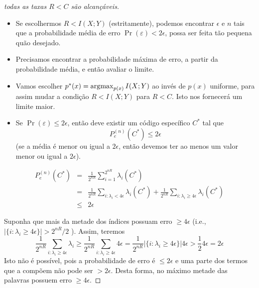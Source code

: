 \begin{frame}[allowframebreaks]
\begin{proof}[todas as taxas $R < C$ são alcançáveis]
  \begin{itemize}
  \item Se escolhermos $R < I(X;Y)$ (estritamente), podemos encontrar $\epsilon$ e $n$ tais que
	a probabilidade média de erro $\Pr(\varepsilon) < 2\epsilon$, possa ser feita tão pequena
	quão desejado.
  \item Precisamos encontrar a probabilidade máxima de erro, a partir da probabilidade média, e então avaliar o limite.
  \item Vamos escolher $p^\ast(x) = \operatorname*{\arg\!\max}_{p(x)} I(X;Y)$ ao invés de $p(x)$ uniforme, para assim mudar
	a condição $R < I(X;Y)$ para $R < C$. Isto nos fornecerá um limite maior.
  \end{itemize}
  \proofbreak
  \begin{itemize}
  \item Se $\Pr(\varepsilon) \leq 2 \epsilon$, então deve existir um código específico $C^\ast$ tal que
	\begin{equation}
	P_e^{(n)} (C^\ast) \leq 2 \epsilon
	\end{equation}
	(se a média é menor ou igual a $2\epsilon$, então devemos ter ao menos um valor menor ou igual a $2\epsilon$).
  \end{itemize}

  \proofbreak

  \begin{eqnarray}
  P_e^{(n)} (C^\ast) &=& \frac{1}{2^{nR}} \sum_{i=1}^{2^{nR}} \lambda_i (C^\ast) \nonumber \\
	&=& \frac{1}{2^{nR}} \sum_{i: \lambda_i < 4\epsilon} \lambda_i (C^\ast) + \frac{1}{2^{nR}} \sum_{i: \lambda_i \geq 4\epsilon} \lambda_i (C^\ast) \nonumber \\
	&\leq& 2 \epsilon
  \end{eqnarray}

  \proofbreak

  Suponha que mais da metade dos índices possuam erro $\geq 4 \epsilon$ 
  (i.e., $\vert \{i: \lambda_i \geq 4 \epsilon \} \vert > 2^{nR}/2$ ). Assim, teremos
  \begin{equation}
  \frac{1}{2^{nR}} \sum_{i: \lambda_i \geq 4\epsilon} \lambda_i \geq \frac{1}{2^{nR}} \sum_{i: \lambda_i \geq 4\epsilon} 4 \epsilon = \frac{1}{2^{nR}} \vert \{i: \lambda_i \geq 4 \epsilon \} \vert 4 \epsilon > \frac{1}{2} 4 \epsilon = 2\epsilon
  \end{equation}
  Isto não é possível, pois a probabilidade de erro é $\leq 2\epsilon$ e uma parte dos termos que a compõem não pode ser $> 2\epsilon$.
  Desta forma, no máximo metade das palavras possuem erro $\geq 4\epsilon$.


\end{proof}
\end{frame}
